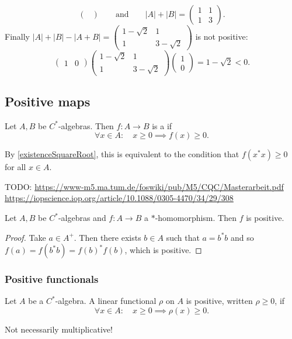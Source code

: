 \begin{example}
\[\begin{pmatrix}
\end{pmatrix} \qquad\text{and}\qquad |A| + |B| = \begin{pmatrix}
1 & 1 \\ 1 & 3
\end{pmatrix}. \]
Finally $|A| + |B| - |A+B| = \begin{pmatrix}
1 - \sqrt{2} & 1 \\ 1 & 3-\sqrt{2}
\end{pmatrix}$ is not positive:
\[ \begin{pmatrix}
1 & 0
\end{pmatrix}\begin{pmatrix}
1 - \sqrt{2} & 1 \\ 1 & 3-\sqrt{2}
\end{pmatrix}\begin{pmatrix}
1 \\ 0
\end{pmatrix} = 1-\sqrt{2} < 0. \]
\end{example}



\subsection{Positive maps}
\begin{definition}
Let $A,B$ be $C^*$-algebras. Then $f:A\to B$ is a  if
\[ \forall x\in A: \quad x\geq 0 \implies f(x)\geq 0. \]
\end{definition}
By \ref{existenceSquareRoot}, this is equivalent to the condition that $f(x^*x)\geq 0$ for all $x\in A$.

TODO: \url{https://www-m5.ma.tum.de/foswiki/pub/M5/CQC/Masterarbeit.pdf}
\url{https://iopscience.iop.org/article/10.1088/0305-4470/34/29/308}

\begin{lemma} \label{starHomomorphismPositive}
Let $A,B$ be $C^*$-algebras and $f:A\to B$ a $*$-homomorphism. Then $f$ is positive.
\end{lemma}
\begin{proof}
Take $a\in A^+$. Then there exists $b\in A$ such that $a = b^*b$ and so $f(a) = f(b^*b) = f(b)^*f(b)$, which is positive.
\end{proof}

\subsubsection{Positive functionals}
\begin{definition}
Let $A$ be a $C^*$-algebra. A linear functional $\rho$ on $A$ is positive, written $\rho\geq 0$, if
\[ \forall x\in A: \quad x\geq 0 \implies \rho(x)\geq 0. \]
\end{definition}
Not necessarily multiplicative!

